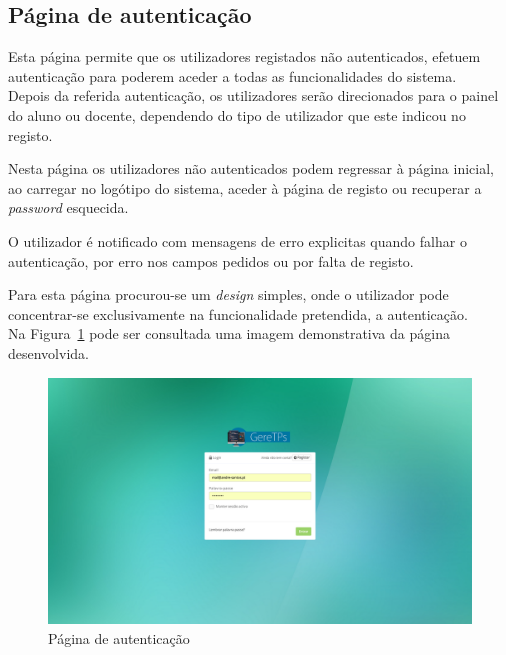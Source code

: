 \subsection{Página de autenticação}

Esta página permite que os utilizadores registados não autenticados, efetuem autenticação para poderem aceder a todas as funcionalidades do sistema.\\

Depois da referida autenticação, os utilizadores serão direcionados para o painel do aluno ou docente, dependendo do tipo de utilizador que este indicou no registo.

Nesta página os utilizadores não autenticados podem regressar à página inicial, ao carregar no logótipo do sistema, aceder à página de registo ou recuperar a \textit{password} esquecida.

O utilizador é notificado com mensagens de erro explicitas quando falhar o autenticação, por erro nos campos pedidos ou por falta de registo.

Para esta página procurou-se um \textit{design} simples, onde o utilizador pode concentrar-se exclusivamente na funcionalidade pretendida, a autenticação.\\

Na Figura~\ref{fig:sign_in} pode ser consultada uma imagem demonstrativa da página desenvolvida.\\

\begin{figure}[H]
  \centering
  \includegraphics[width=1\textwidth,center]{images/implementacao/sign_in}
  \caption{Página de autenticação}
  \label{fig:sign_in}
\end{figure}
